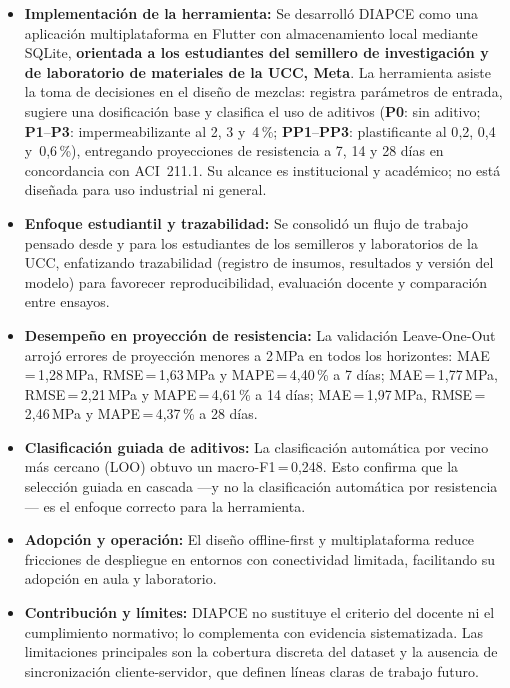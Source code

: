 \documentclass[12pt, letterpaper]{article}
\begin{document}
\begin{itemize}
  \item \textbf{Implementación de la herramienta:} Se desarrolló DIAPCE como una aplicación multiplataforma en Flutter con almacenamiento local mediante SQLite, \textbf{orientada a los estudiantes del semillero de investigación y de laboratorio de materiales de la UCC, Meta}. La herramienta asiste la toma de decisiones en el diseño de mezclas: registra parámetros de entrada, sugiere una dosificación base y clasifica el uso de aditivos (\textbf{P0}: sin aditivo; \textbf{P1}--\textbf{P3}: impermeabilizante al 2, 3 y~4\,\%; \textbf{PP1}--\textbf{PP3}: plastificante al 0{,}2, 0{,}4 y~0{,}6\,\%), entregando proyecciones de resistencia a 7, 14 y 28 días en concordancia con ACI~211.1. Su alcance es institucional y académico; no está diseñada para uso industrial ni general.

  \item \textbf{Enfoque estudiantil y trazabilidad:} Se consolidó un flujo de trabajo pensado desde y para los estudiantes de los semilleros y laboratorios de la UCC, enfatizando trazabilidad (registro de insumos, resultados y versión del modelo) para favorecer reproducibilidad, evaluación docente y comparación entre ensayos.

  \item \textbf{Desempeño en proyección de resistencia:} La validación Leave-One-Out arrojó errores de proyección menores a 2\,MPa en todos los horizontes: MAE\,=\,1{,}28\,MPa, RMSE\,=\,1{,}63\,MPa y MAPE\,=\,4{,}40\,\% a 7 días; MAE\,=\,1{,}77\,MPa, RMSE\,=\,2{,}21\,MPa y MAPE\,=\,4{,}61\,\% a 14 días; MAE\,=\,1{,}97\,MPa, RMSE\,=\,2{,}46\,MPa y MAPE\,=\,4{,}37\,\% a 28 días.

  \item \textbf{Clasificación guiada de aditivos:} La clasificación automática por vecino más cercano (LOO) obtuvo un macro-F1\,=\,0{,}248. Esto confirma que la selección guiada en cascada ---y no la clasificación automática por resistencia--- es el enfoque correcto para la herramienta.

  \item \textbf{Adopción y operación:} El diseño offline-first y multiplataforma reduce fricciones de despliegue en entornos con conectividad limitada, facilitando su adopción en aula y laboratorio.

  \item \textbf{Contribución y límites:} DIAPCE no sustituye el criterio del docente ni el cumplimiento normativo; lo complementa con evidencia sistematizada. Las limitaciones principales son la cobertura discreta del dataset y la ausencia de sincronización cliente-servidor, que definen líneas claras de trabajo futuro.
\end{itemize}
\end{document}
